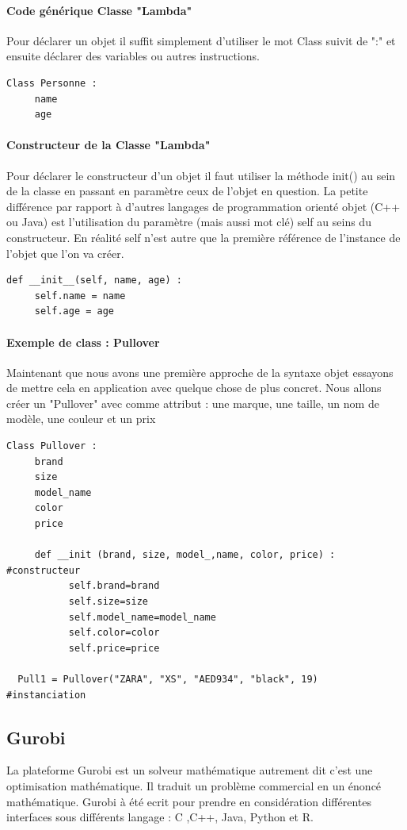 \documentclass[a4paper, 12pt, twoside]{article}
\begin{document}
\paragraph{Code générique Classe "Lambda"}
Pour déclarer un objet il suffit simplement d'utiliser le mot Class suivit de ":" et ensuite déclarer des variables ou autres instructions.
\begin{verbatim}
Class Personne : 
     name
     age
\end{verbatim}
\paragraph{Constructeur de la Classe "Lambda"}{Pour déclarer le constructeur d'un objet il faut utiliser la méthode \textsf{init()} au sein de la classe en passant en paramètre ceux de l'objet en question. La petite différence par rapport à d'autres langages de programmation orienté objet (C++ ou Java) est l'utilisation du paramètre (mais aussi mot clé) \textsf{self} au seins du constructeur. En réalité \textsf{self} n'est autre que la première référence de l'instance de l'objet que l'on va créer. } 
\begin{verbatim}
def __init__(self, name, age) :
     self.name = name
     self.age = age
\end{verbatim}
\paragraph{Exemple de class : Pullover}{Maintenant que nous avons une première approche de la syntaxe objet essayons de mettre cela en application avec quelque chose de plus concret. Nous allons créer un "Pullover" avec comme attribut : une marque, une taille, un nom de modèle, une couleur et un prix }
\begin{verbatim}
Class Pullover : 
     brand
     size
     model_name
     color
     price
   
     def __init (brand, size, model_,name, color, price) :       #constructeur
           self.brand=brand
           self.size=size
           self.model_name=model_name
           self.color=color
           self.price=price
          
  Pull1 = Pullover("ZARA", "XS", "AED934", "black", 19)         #instanciation  
\end{verbatim}
\newpage
\subsection{Gurobi}
La plateforme Gurobi est un solveur mathématique autrement dit c'est une optimisation mathématique. Il traduit un problème commercial en un énoncé mathématique. Gurobi à été ecrit pour prendre en considération différentes interfaces sous différents langage : \textsf{C ,C++, Java, Python et R}. \newline
\end{document}
